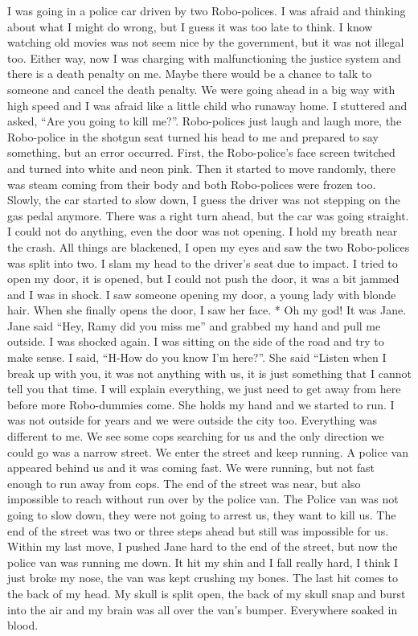 \documentclass[]{book}
\begin{document}
I was going in a police car driven by two Robo-polices. I was afraid and thinking about what I might do wrong, but I guess it was too late to think. I know watching old movies was not seem nice by the government, but it was not illegal too. Either way, now I was charging with malfunctioning the justice system and there is a death penalty on me. Maybe there would be a chance to talk to someone and cancel the death penalty. We were going ahead in a big way with high speed and I was afraid like a little child who runaway home. I stuttered and asked, ``Are you going to kill me?''. Robo-polices just laugh and laugh more, the Robo-police in the shotgun seat turned his head to me and prepared to say something, but an error occurred. First, the Robo-police's face screen twitched and turned into white and neon pink. Then it started to move randomly, there was steam coming from their body and both Robo-polices were frozen too. Slowly, the car started to slow down, I guess the driver was not stepping on the gas pedal anymore. There was a right turn ahead, but the car was going straight. I could not do anything, even the door was not opening. I hold my breath near the crash. All things are blackened, I open my eyes and saw the two Robo-polices was split into two. I slam my head to the driver's seat due to impact. I tried to open my door, it is opened, but I could not push the door, it was a bit jammed and I was in shock. I saw someone opening my door, a young lady with blonde hair. When she finally opens the door, I saw her face.
* Oh my god! It was Jane. Jane said ``Hey, Ramy did you miss me'' and grabbed my hand and pull me outside. I was shocked again. I was sitting on the side of the road and try to make sense. I said, ``H-How do you know I'm here?''. She said ``Listen when I break up with you, it was not anything with us, it is just something that I cannot tell you that time. I will explain everything, we just need to get away from here before more Robo-dummies come. She holds my hand and we started to run. I was not outside for years and we were outside the city too. Everything was different to me. We see some cops searching for us and the only direction we could go was a narrow street. We enter the street and keep running. A police van appeared behind us and it was coming fast. We were running, but not fast enough to run away from cops. The end of the street was near, but also impossible to reach without run over by the police van. The Police van was not going to slow down, they were not going to arrest us, they want to kill us. The end of the street was two or three steps ahead but still was impossible for us. Within my last move, I pushed Jane hard to the end of the street, but now the police van was running me down. It hit my shin and I fall really hard, I think I just broke my nose, the van was kept crushing my bones. The last hit comes to the back of my head. My skull is split open, the back of my skull snap and burst into the air and my brain was all over the van's bumper. Everywhere soaked in blood.
\end{document}
